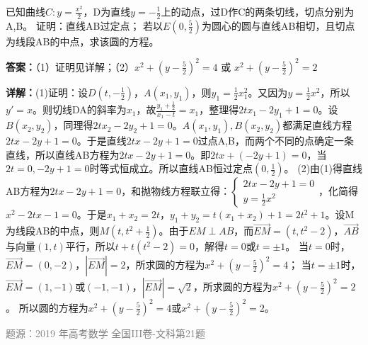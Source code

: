 \begin{question}
已知曲线$C:y=\frac{x^2}{2}$，D为直线$y=-\frac{1}{2}$上的动点，过D作C的两条切线，切点分别为A,B。
证明：直线AB过定点；
若以$E(0,\frac{5}{2})$为圆心的圆与直线AB相切，且切点为线段AB的中点，求该圆的方程。
\begin{solution}
\textbf{答案：}（1）证明见详解；（2）$x^2+(y-\frac{5}{2})^2=4$ 或 $x^2+(y-\frac{5}{2})^2=2$

\textbf{详解：}(1)证明：设$D(t,-\frac{1}{2})$，$A(x_1,y_1)$，则$y_1=\frac{1}{2}x_1^2$。又因为$y=\frac{1}{2}x^2$，所以$y'=x$。则切线DA的斜率为$x_1$，故$\frac{y_1+\frac{1}{2}}{x_1-t}=x_1$，整理得$2tx_1-2y_1+1=0$。设$B(x_2,y_2)$，同理得$2tx_2-2y_2+1=0$。$A(x_1,y_1),B(x_2,y_2)$都满足直线方程$2tx-2y+1=0$。于是直线$2tx-2y+1=0$过点A,B，而两个不同的点确定一条直线，所以直线AB方程为$2tx-2y+1=0$。即$2tx+(-2y+1)=0$，当$2t=0,-2y+1=0$时等式恒成立。所以直线AB恒过定点$(0,\frac{1}{2})$。
(2)由(1)得直线AB方程为$2tx-2y+1=0$，和抛物线方程联立得：$\begin{cases} 2tx-2y+1=0 \\ y=\frac{1}{2}x^2 \end{cases}$，化简得$x^2-2tx-1=0$。于是$x_1+x_2=2t$，$y_1+y_2=t(x_1+x_2)+1=2t^2+1$。设M为线段AB的中点，则$M(t,t^2+\frac{1}{2})$。由于$EM\perp AB$，而$\overrightarrow{EM}=(t,t^2-2)$，$\overrightarrow{AB}$与向量$(1,t)$平行，所以$t+t(t^2-2)=0$，解得$t=0$或$t=\pm1$。
当$t=0$时，$\overrightarrow{EM}=(0,-2)$，$|\overrightarrow{EM}|=2$，所求圆的方程为$x^2+(y-\frac{5}{2})^2=4$；
当$t=\pm1$时，$\overrightarrow{EM}=(1,-1)$或$(-1,-1)$，$|\overrightarrow{EM}|=\sqrt{2}$，所求圆的方程为$x^2+(y-\frac{5}{2})^2=2$。
所以圆的方程为$x^2+(y-\frac{5}{2})^2=4$或$x^2+(y-\frac{5}{2})^2=2$。

\textcolor{gray}{\footnotesize 题源：2019 年高考数学 全国III卷-文科第21题}
\end{solution}
\end{question}


